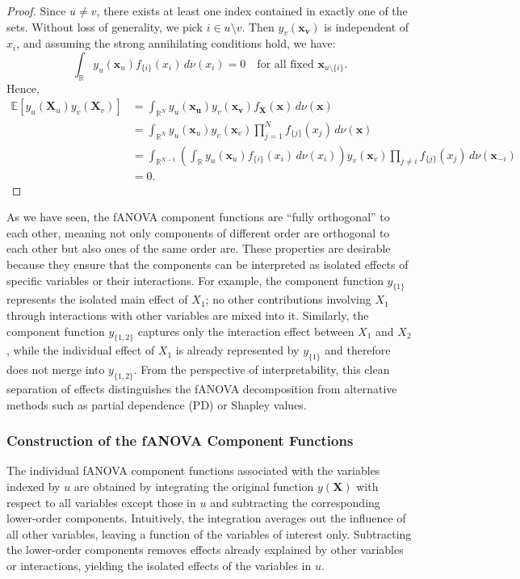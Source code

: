 \begin{proof}
Since $u \neq v$, there exists at least one index contained in exactly one of the sets.
Without loss of generality, we pick $i \in u \setminus v$.
Then $y_v(\boldsymbol{x_v})$ is independent of $x_i$, and assuming the strong annihilating conditions hold, we have:
\[
    \int_{\mathbb{R}} y_u(\boldsymbol{x}_u) f_{\{i\}}(x_i)\,d\nu(x_i) = 0
    \quad \text{for all fixed } \boldsymbol{x}_{u\setminus \{i\}}.
\]
Hence,
\begin{align*}
    \mathbb{E}[y_u(\boldsymbol{X}_u) y_v(\boldsymbol{X}_v)] &= \int_{\mathbb{R}^{N}} y_u(\boldsymbol{x_u}) y_v(\boldsymbol{x_v}) f_{\boldsymbol{X}}(\boldsymbol{x}) \, d\nu (\boldsymbol{x}) \\
    &= \int_{\mathbb{R}^{N}} y_u(\boldsymbol{x}_u) y_v(\boldsymbol{x}_v)
       \prod_{j=1}^N f_{\{j\}}(x_j)\, d\nu(\boldsymbol{x}) \\
    &= \int_{\mathbb{R}^{N-1}}
        \left(\int_{\mathbb{R}} y_u(\boldsymbol{x}_u) f_{\{i\}}(x_i)\,d\nu(x_i)\right)
        y_v(\boldsymbol{x}_v)\prod_{j \neq i} f_{\{j\}}(x_j)\,d\nu(\boldsymbol{x}_{-i})\\
    &= 0.
\end{align*}
\end{proof}
As we have seen, the fANOVA component functions are ``fully orthogonal'' to each other, meaning not only components of different order are orthogonal to each other but also ones of the same order are.
These properties are desirable because they ensure that the components can be interpreted as 
isolated effects of specific variables or their interactions. 
For example, the component function $y_{\{1\}}$ represents the 
isolated main effect of $X_1$; no other contributions 
involving $X_1$ through interactions with other variables are mixed into it. 
Similarly, the component function $y_{\{1,2\}}$ captures only the 
interaction effect between $X_1$ and $X_2$, while the individual effect 
of $X_1$ is already represented by $y_{\{1\}}$ and therefore does not 
merge into $y_{\{1,2\}}$. 
From the perspective of interpretability, this clean separation of effects 
distinguishes the fANOVA decomposition from alternative methods such as 
partial dependence (PD) or Shapley values.

\subsubsection{Construction of the fANOVA Component Functions}
The individual fANOVA component functions associated with the variables 
indexed by $u$ are obtained by integrating the original function 
$y(\boldsymbol{X})$ with respect to all variables except those in $u$ and 
subtracting the corresponding lower-order components. 
Intuitively, the integration averages out the influence of all other variables, 
leaving a function of the variables of interest only. 
Subtracting the lower-order components removes effects already explained by 
other variables or interactions, yielding the isolated effects of the variables in $u$. 

